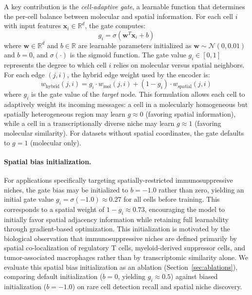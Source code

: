 \documentclass{article}
\begin{document}
A key contribution is the \emph{cell-adaptive gate}, a learnable function that determines the per-cell balance between molecular and spatial information. For each cell $i$ with input features $\mathbf{x}_i \in \mathbb{R}^d$, the gate computes:
\begin{equation}
g_i = \sigma(\mathbf{w}^T \mathbf{x}_i + b)
\end{equation}
where $\mathbf{w} \in \mathbb{R}^d$ and $b \in \mathbb{R}$ are learnable parameters initialized as $\mathbf{w} \sim \mathcal{N}(0, 0.01)$ and $b = 0$, and $\sigma(\cdot)$ is the sigmoid function. The gate value $g_i \in [0, 1]$ represents the degree to which cell $i$ relies on molecular versus spatial neighbors. For each edge $(j, i)$, the hybrid edge weight used by the encoder is:
\begin{equation}
w_{\text{hybrid}}(j,i) = g_i \cdot w_{\text{mol}}(j,i) + (1 - g_i) \cdot w_{\text{spatial}}(j,i)
\end{equation}
where $g_i$ is the gate value of the \emph{target} node. This formulation allows each cell to adaptively weight its incoming messages: a cell in a molecularly homogeneous but spatially heterogeneous region may learn $g \approx 0$ (favoring spatial information), while a cell in a transcriptionally diverse niche may learn $g \approx 1$ (favoring molecular similarity). For datasets without spatial coordinates, the gate defaults to $g = 1$ (molecular only).

\paragraph{Spatial bias initialization.} For applications specifically targeting spatially-restricted immunosuppressive niches, the gate bias may be initialized to $b = -1.0$ rather than zero, yielding an initial gate value $g_i = \sigma(-1.0) \approx 0.27$ for all cells before training. This corresponds to a spatial weight of $1 - g_i \approx 0.73$, encouraging the model to initially favor spatial adjacency information while retaining full learnability through gradient-based optimization. This initialization is motivated by the biological observation that immunosuppressive niches are defined primarily by spatial co-localization of regulatory T cells, myeloid-derived suppressor cells, and tumor-associated macrophages rather than by transcriptomic similarity alone. We evaluate this spatial bias initialization as an ablation (Section~\ref{sec:ablations}), comparing default initialization ($b = 0$, yielding $g_i \approx 0.5$) against biased initialization ($b = -1.0$) on rare cell detection recall and spatial niche discovery.
\end{document}
